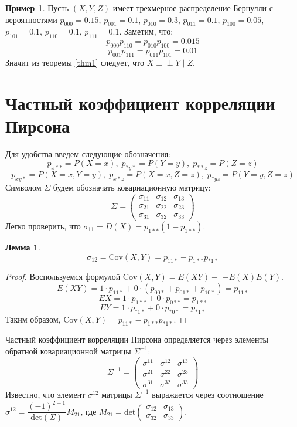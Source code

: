 \documentclass[a4paper,14pt]{extarticle}
\theoremstyle{definition}
\newtheorem{example}{Пример}[section]
\newtheorem{lemma}{Лемма}[section]
\def\ci{\perp\!\!\!\perp}
\begin{document}
\begin{example}
    Пусть $(X,Y,Z)$ имеет трехмерное распределение Бернулли с вероятностями
    $p_{000}=0.15$, $p_{001}=0.1$, $p_{010}=0.3$, $p_{011}=0.1$, $p_{100}=0.05$, $p_{101}=0.1$,
    $p_{110}=0.1$, $p_{111}=0.1$.
    Заметим, что:
    $$p_{000}p_{110}=p_{010}p_{100}=0.015$$ $$p_{001}p_{111}=p_{011}p_{101}=0.01$$
    Значит из теоремы \ref{thm1} следует, что $X \ci Y \mid Z$.
\end{example}

\section{Частный коэффициент корреляции Пирсона}
Для удобства введем следующие обозначения: $$p_{x**}=P(X=x), \; p_{*y*}=P(Y=y), \; p_{**z}=P(Z=z)$$
$$p_{xy*}=P(X=x, Y=y), \; p_{x*z}=P(X=x, Z=z), \; p_{*yz}=P(Y=y, Z=z)$$
Символом $\Sigma$ будем обозначать ковариационную матрицу:
$$\Sigma =
    \begin{pmatrix}
        \sigma_{11} & \sigma_{12} & \sigma_{13} \\
        \sigma_{21} & \sigma_{22} & \sigma_{23} \\
        \sigma_{31} & \sigma_{32} & \sigma_{33}
    \end{pmatrix}
$$
Легко проверить, что $\sigma_{11}=D(X) = p_{1**}(1-p_{1**})$.

\begin{lemma}
    $$\sigma_{12}=\text{Cov}(X,Y)=p_{11*}-p_{1**}p_{*1*}$$
\end{lemma}

\begin{proof}
    Воспользуемся формулой $\text{Cov}(X,Y)=E(X Y)-$ $-E(X)E(Y)$.
    $$E(X Y) = 1 \cdot p_{11*} + 0 \cdot (p_{00*} + p_{01*} + p_{10*})=p_{11*}$$
    $$EX = 1 \cdot p_{1**} + 0 \cdot p_{0**}=p_{1**}$$
    $$ EY = 1 \cdot p_{*1*} + 0 \cdot p_{*0*} = p_{*1*}$$
    Таким образом, $\text{Cov}(X,Y)=p_{11*}-p_{1**}p_{*1*}$.
\end{proof}

Частный коэффициент корреляции Пирсона определяется через элементы обратной ковариационной матрицы $\Sigma^{-1}$:
$$
    \Sigma^{-1}=\begin{pmatrix}
        \sigma^{11} & \sigma^{12} & \sigma^{13} \\
        \sigma^{21} & \sigma^{22} & \sigma^{23} \\
        \sigma^{31} & \sigma^{32} & \sigma^{33}
    \end{pmatrix}
$$
Известно, что элемент $\sigma^{12}$ матрицы $\Sigma^{-1}$ выражается через соотношение
$\sigma^{12}=\dfrac{(-1)^{2+1}}{\text{det} (\Sigma)}M_{21}$, где
$
    M_{21}=\text{det}
    \begin{pmatrix}
        \sigma_{12} & \sigma_{13} \\
        \sigma_{32} & \sigma_{33}
    \end{pmatrix}
$.
\end{document}
